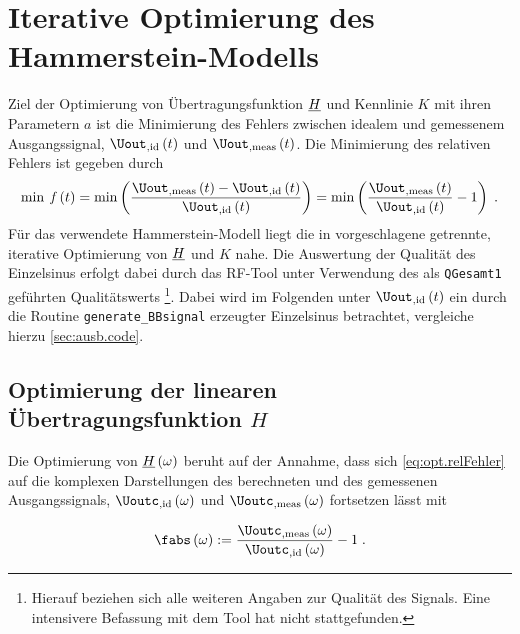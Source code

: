 \documentclass[../Report.tex]{subfiles}
\begin{document}
\chapter{Iterative Optimierung des Hammerstein-Modells}
\label{chap:opt}

Ziel der Optimierung von Übertragungsfunktion $\underline{H}$ und Kennlinie $K$ mit ihren Parametern $a$ ist die Minimierung des Fehlers zwischen idealem und gemessenem Ausgangssignal, $\Uout_{, \mathrm{id}} \oft$ und $\Uout_{, \mathrm{meas}} \oft$. Die Minimierung des relativen Fehlers ist gegeben durch
\begin{align}
\label{eq:opt.relFehler}
	\min \; \mathit{f} \oft = \min \left( \frac{\Uout_{, \mathrm{meas}} \oft  - \Uout_{, \mathrm{id}} \oft}{ \Uout_{, \mathrm{id}} \oft} \right) 
	= \min \left( \frac{ \Uout_{, \mathrm{meas}}\oft}{ \Uout_{, \mathrm{id}}\oft} -1 \right) 
	\; .
\end{align}
Für das verwendete Hammerstein-Modell liegt die in \cite{harzheim18}
vorgeschlagene getrennte, iterative Optimierung von $\underline{H}$ und $K$ nahe. 
Die Auswertung der Qualität des Einzelsinus erfolgt dabei durch das RF-Tool \cite{RF-Tool} unter Verwendung des als \lstinline{QGesamt1} geführten Qualitätswerts \footnote{\label{foot:opt.H.quality} Hierauf beziehen sich alle weiteren Angaben zur Qualität des Signals. Eine intensivere Befassung mit dem Tool hat nicht stattgefunden.}.
Dabei wird im Folgenden unter $\Uout_{, \mathrm{id}} \oft$ ein durch die Routine \lstinline{generate_BBsignal} erzeugter Einzelsinus betrachtet, vergleiche hierzu \ref{sec:ausb.code}. 

\section{Optimierung der linearen Übertragungsfunktion $H$}
\label{sec:opt.H}

Die Optimierung von $\underline{H} \left( \omega \right)$ beruht auf der Annahme, dass sich \eqref{eq:opt.relFehler} auf die komplexen Darstellungen des berechneten und des gemessenen Ausgangssignals, $\Uoutc_{, \mathrm{id}} \ofomega $ und $\Uoutc_{, \mathrm{meas}} \ofomega $ fortsetzen lässt mit 

\begin{align}
\label{eq:opt.ratio}
	\fabs \ofomega :=  
				\frac{ \Uoutc_{, \mathrm{meas}} \ofomega }{\Uoutc_{, \mathrm{id}} \ofomega } -1
				\; .
\end{align}
\end{document}
